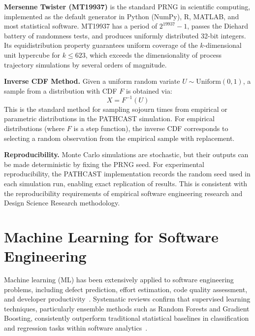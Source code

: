 \textbf{Mersenne Twister (MT19937)} is the standard PRNG in scientific
computing, implemented as the default generator in Python (NumPy), R,
MATLAB, and most statistical software. MT19937 has a period of
$2^{19937} - 1$, passes the Diehard battery of randomness tests, and
produces uniformly distributed 32-bit integers. Its equidistribution
property guarantees uniform coverage of the $k$-dimensional unit hypercube
for $k \leq 623$, which exceeds the dimensionality of process trajectory
simulations by several orders of magnitude.

\textbf{Inverse CDF Method.} Given a uniform random variate
$U \sim \text{Uniform}(0,1)$, a sample from a distribution with CDF $F$
is obtained via:
\begin{equation}
\label{eq:inverse-cdf}
X = F^{-1}(U)
\end{equation}
This is the standard method for sampling sojourn times from empirical or
parametric distributions in the PATHCAST simulation. For empirical
distributions (where $F$ is a step function), the inverse CDF corresponds
to selecting a random observation from the empirical sample with
replacement.

\textbf{Reproducibility.} Monte Carlo simulations are stochastic, but
their outputs can be made deterministic by fixing the PRNG seed. For
experimental reproducibility, the PATHCAST implementation records
the random seed used in each simulation run, enabling exact replication
of results. This is consistent with the reproducibility requirements of
empirical software engineering research and Design Science Research
methodology.


\section{Machine Learning for Software Engineering}
\label{sec:ml-se}

Machine learning (ML) has been extensively applied to software engineering
problems, including defect prediction, effort estimation, code quality
assessment, and developer productivity~\cite{Wahono2015, pachouly2022}.
Systematic reviews confirm that supervised learning techniques, particularly
ensemble methods such as Random Forests and Gradient Boosting, consistently
outperform traditional statistical baselines in classification and regression
tasks within software analytics~\cite{pachouly2022}. 

